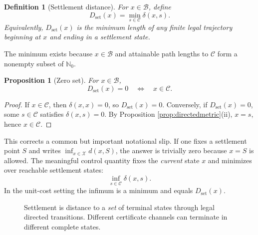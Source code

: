 \documentclass[11pt,letterpaper]{article}
\newtheorem{proposition}[theorem]{Proposition}
\newtheorem{definition}[theorem]{Definition}
\theoremstyle{remark}
\newcommand{\X}{\mathcal X}
\newcommand{\Cset}{\mathcal C}
\newcommand{\Basin}{\mathcal B}
\newcommand{\N}{\mathbb N}
\newcommand{\dset}{D_{\mathrm{set}}}
\begin{document}
\begin{definition}[Settlement distance]
For $x\in\Basin$, define
\[
\dset(x)=\min_{s\in\Cset}\delta(x,s).
\]
Equivalently, $\dset(x)$ is the minimum length of any finite legal trajectory beginning at $x$ and ending in a settlement state.
\end{definition}

The minimum exists because $x\in\Basin$ and attainable path lengths to $\Cset$ form a nonempty subset of $\N_0$.

\begin{proposition}[Zero set]\label{prop:zeroset}
For $x\in\Basin$,
\[
\dset(x)=0\quad\Longleftrightarrow\quad x\in\Cset.
\]
\end{proposition}

\begin{proof}
If $x\in\Cset$, then $\delta(x,x)=0$, so $\dset(x)=0$. Conversely, if $\dset(x)=0$, some $s\in\Cset$ satisfies $\delta(x,s)=0$. By Proposition \ref{prop:directedmetric}(ii), $x=s$, hence $x\in\Cset$.
\end{proof}

This corrects a common but important notational slip. If one fixes a settlement point $S$ and writes $\inf_{x\in\X}d(x,S)$, the answer is trivially zero because $x=S$ is allowed. The meaningful control quantity fixes the \emph{current} state $x$ and minimizes over reachable settlement states:
\[
\inf_{s\in\Cset}\delta(x,s).
\]
In the unit-cost setting the infimum is a minimum and equals $\dset(x)$.

\begin{figure}[ht]
\centering
{}
\caption{Settlement is distance to a \emph{set} of terminal states through legal directed transitions. Different certificate channels can terminate in different complete states.}
\label{fig:directed}
\end{figure}
\end{document}
